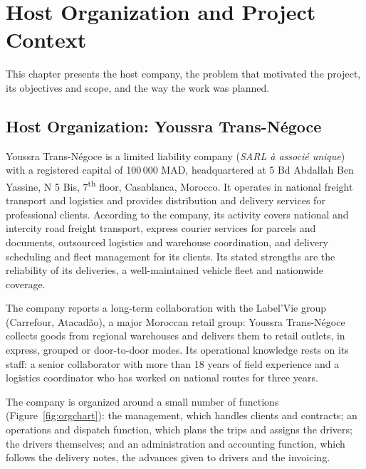 
\chapter{Host Organization and Project Context}\label{chap:context}

This chapter presents the host company, the problem that motivated the project, its objectives and scope, and the way the work was planned.

\section{Host Organization: Youssra Trans-Négoce}

Youssra Trans-Négoce is a limited liability company (\emph{SARL à associé unique}) with a registered capital of 100\,000 MAD, headquartered at 5 Bd Abdallah Ben Yassine, N\textdegree{} 5 Bis, 7\textsuperscript{th} floor, Casablanca, Morocco. It operates in national freight transport and logistics and provides distribution and delivery services for professional clients. According to the company, its activity covers national and intercity road freight transport, express courier services for parcels and documents, outsourced logistics and warehouse coordination, and delivery scheduling and fleet management for its clients. Its stated strengths are the reliability of its deliveries, a well-maintained vehicle fleet and nationwide coverage.

The company reports a long-term collaboration with the Label'Vie group (Carrefour, Atacadão), a major Moroccan retail group: Youssra Trans-Négoce collects goods from regional warehouses and delivers them to retail outlets, in express, grouped or door-to-door modes. Its operational knowledge rests on its staff: a senior collaborator with more than 18 years of field experience and a logistics coordinator who has worked on national routes for three years.

The company is organized around a small number of functions (Figure~\ref{fig:orgchart}): the management, which handles clients and contracts; an operations and dispatch function, which plans the trips and assigns the drivers; the drivers themselves; and an administration and accounting function, which follows the delivery notes, the advances given to drivers and the invoicing.

